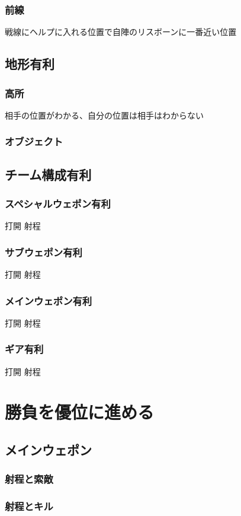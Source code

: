 \documentclass[a4paper,11pt]{jsbook}
\begin{document}
\section{前線}
戦線にヘルプに入れる位置で自陣のリスボーンに一番近い位置

\chapter{地形有利}
\section{高所}
相手の位置がわかる、自分の位置は相手はわからない

\section{オブジェクト}
\chapter{チーム構成有利}
\section{スペシャルウェポン有利}
打開
射程
\section{サブウェポン有利}
打開
射程
\section{メインウェポン有利}
打開
射程
\section{ギア有利}
打開
射程

\part{勝負を優位に進める}
\chapter{メインウェポン}
\section{射程と索敵}
\section{射程とキル}
\end{document}
